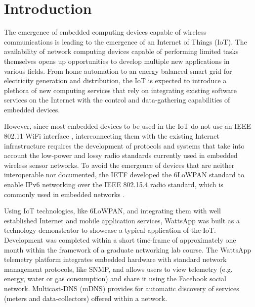 \documentclass[10pt, conference, compsocconf]{IEEEtran}
\begin{document}
\section{Introduction}

The emergence of embedded computing devices capable of wireless communications
is leading to the emergence of an Internet of Things (IoT). The availability
of network computing devices capable of performing limited tasks themselves
opens up opportunities to develop multiple new applications in various
fields. From home automation to an energy balanced smart grid for
electricity generation and distribution, the IoT is expected to introduce
a plethora of new computing services that rely on integrating existing
software services on the Internet with the control and data-gathering
capabilities of embedded devices.

However, since most embedded devices to be used in the IoT do not
use an IEEE 802.11 WiFi interface \cite{durvy08making}, interconnecting
them with the existing Internet infrastructure requires the development
of protocols and systems that take into account the low-power and
lossy radio standards currently used in embedded wireless sensor networks.
To avoid the emergence of devices that are neither interoperable nor documented, the IETF developed the 6LoWPAN standard \cite{rfc-4,rfc-5} to enable IPv6 networking over the IEEE 802.15.4 radio standard, which is commonly used in embedded networks \cite{6lowpan-1}.

Using IoT technologies, like 6LoWPAN, and integrating them with well
established Internet and mobile application services, WattsApp was
built as a technology demonstrator to showcase a typical application
of the IoT. Development was completed within a short time-frame of
approximately one month within the framework of a graduate networking
lab course. The WattsApp telemetry platform integrates embedded hardware
with standard network management protocols, like SNMP, and allows
users to view telemetry (e.g. energy, water or gas consumption) and
share it using the Facebook social network. Multicast-DNS (mDNS) provides
for automatic discovery of services (meters and data-collectors) offered
within a network.
\end{document}
